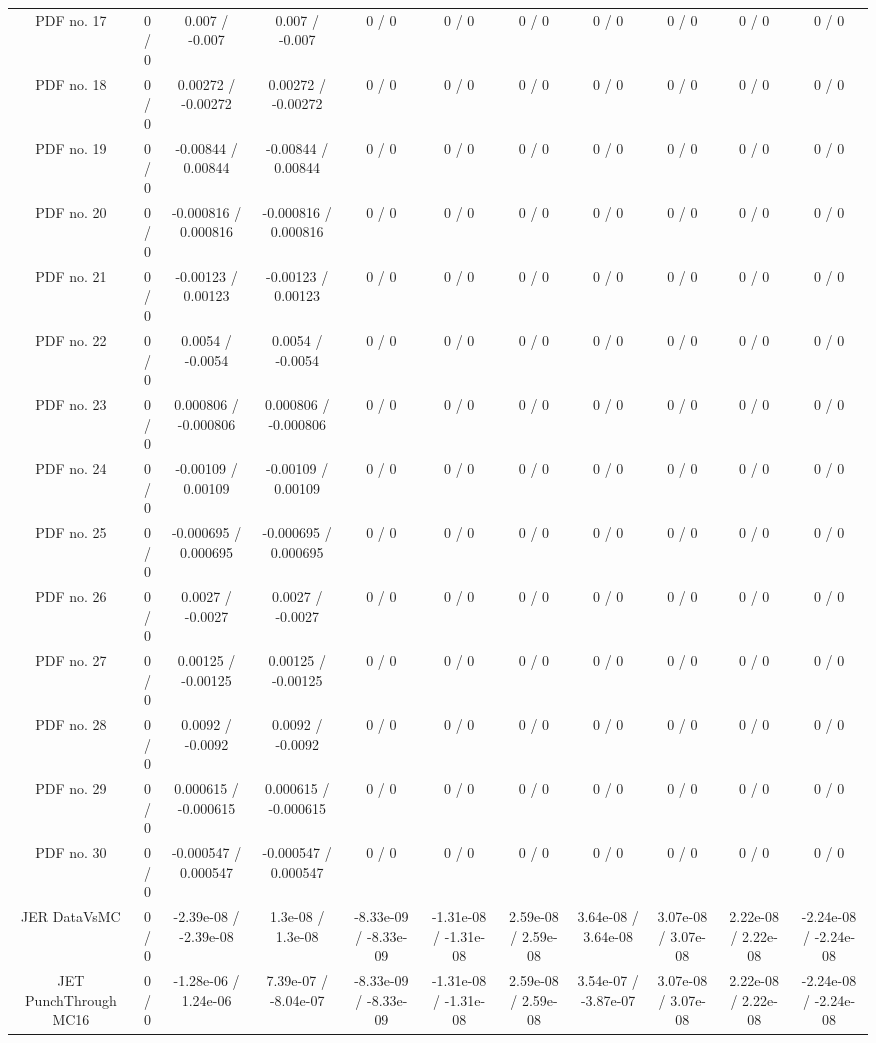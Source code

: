 \begin{table}[htbp]
\begin{center}
\begin{tabular}{|c|c|c|c|c|c|c|c|c|c|c|}
  PDF no. 17 & 0 / 0 & 0.007 / -0.007 & 0.007 / -0.007 & 0 / 0 & 0 / 0 & 0 / 0 & 0 / 0 & 0 / 0 & 0 / 0 & 0 / 0 \\ 
  PDF no. 18 & 0 / 0 & 0.00272 / -0.00272 & 0.00272 / -0.00272 & 0 / 0 & 0 / 0 & 0 / 0 & 0 / 0 & 0 / 0 & 0 / 0 & 0 / 0 \\ 
  PDF no. 19 & 0 / 0 & -0.00844 / 0.00844 & -0.00844 / 0.00844 & 0 / 0 & 0 / 0 & 0 / 0 & 0 / 0 & 0 / 0 & 0 / 0 & 0 / 0 \\ 
  PDF no. 20 & 0 / 0 & -0.000816 / 0.000816 & -0.000816 / 0.000816 & 0 / 0 & 0 / 0 & 0 / 0 & 0 / 0 & 0 / 0 & 0 / 0 & 0 / 0 \\ 
  PDF no. 21 & 0 / 0 & -0.00123 / 0.00123 & -0.00123 / 0.00123 & 0 / 0 & 0 / 0 & 0 / 0 & 0 / 0 & 0 / 0 & 0 / 0 & 0 / 0 \\ 
  PDF no. 22 & 0 / 0 & 0.0054 / -0.0054 & 0.0054 / -0.0054 & 0 / 0 & 0 / 0 & 0 / 0 & 0 / 0 & 0 / 0 & 0 / 0 & 0 / 0 \\ 
  PDF no. 23 & 0 / 0 & 0.000806 / -0.000806 & 0.000806 / -0.000806 & 0 / 0 & 0 / 0 & 0 / 0 & 0 / 0 & 0 / 0 & 0 / 0 & 0 / 0 \\ 
  PDF no. 24 & 0 / 0 & -0.00109 / 0.00109 & -0.00109 / 0.00109 & 0 / 0 & 0 / 0 & 0 / 0 & 0 / 0 & 0 / 0 & 0 / 0 & 0 / 0 \\ 
  PDF no. 25 & 0 / 0 & -0.000695 / 0.000695 & -0.000695 / 0.000695 & 0 / 0 & 0 / 0 & 0 / 0 & 0 / 0 & 0 / 0 & 0 / 0 & 0 / 0 \\ 
  PDF no. 26 & 0 / 0 & 0.0027 / -0.0027 & 0.0027 / -0.0027 & 0 / 0 & 0 / 0 & 0 / 0 & 0 / 0 & 0 / 0 & 0 / 0 & 0 / 0 \\ 
  PDF no. 27 & 0 / 0 & 0.00125 / -0.00125 & 0.00125 / -0.00125 & 0 / 0 & 0 / 0 & 0 / 0 & 0 / 0 & 0 / 0 & 0 / 0 & 0 / 0 \\ 
  PDF no. 28 & 0 / 0 & 0.0092 / -0.0092 & 0.0092 / -0.0092 & 0 / 0 & 0 / 0 & 0 / 0 & 0 / 0 & 0 / 0 & 0 / 0 & 0 / 0 \\ 
  PDF no. 29 & 0 / 0 & 0.000615 / -0.000615 & 0.000615 / -0.000615 & 0 / 0 & 0 / 0 & 0 / 0 & 0 / 0 & 0 / 0 & 0 / 0 & 0 / 0 \\ 
  PDF no. 30 & 0 / 0 & -0.000547 / 0.000547 & -0.000547 / 0.000547 & 0 / 0 & 0 / 0 & 0 / 0 & 0 / 0 & 0 / 0 & 0 / 0 & 0 / 0 \\ 
  JER DataVsMC & 0 / 0 & -2.39e-08 / -2.39e-08 & 1.3e-08 / 1.3e-08 & -8.33e-09 / -8.33e-09 & -1.31e-08 / -1.31e-08 & 2.59e-08 / 2.59e-08 & 3.64e-08 / 3.64e-08 & 3.07e-08 / 3.07e-08 & 2.22e-08 / 2.22e-08 & -2.24e-08 / -2.24e-08 \\ 
  JET PunchThrough MC16 & 0 / 0 & -1.28e-06 / 1.24e-06 & 7.39e-07 / -8.04e-07 & -8.33e-09 / -8.33e-09 & -1.31e-08 / -1.31e-08 & 2.59e-08 / 2.59e-08 & 3.54e-07 / -3.87e-07 & 3.07e-08 / 3.07e-08 & 2.22e-08 / 2.22e-08 & -2.24e-08 / -2.24e-08 \\ 

\end{tabular}
\end{center}
\end{table}
